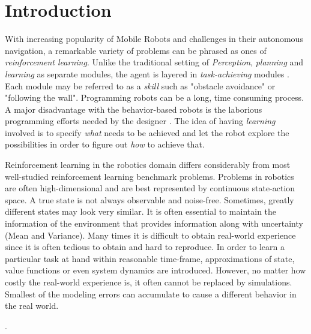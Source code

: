 \documentclass[12pt]{report}
\begin{document}
\tableofcontents
\pagebreak

\listoffigures
\pagebreak

\listoftables
\pagebreak

\printacronyms
\pagebreak

\pagestyle{myheadings}



\chapter{Introduction} %

\label{introduction} %

With increasing popularity of Mobile Robots and challenges in their autonomous navigation, a remarkable variety of problems can be phrased as ones of \textit{reinforcement learning}. Unlike the traditional setting of \textit{Perception}, \textit{planning} and \textit{learning} as separate modules, the agent is layered in \textit{task-achieving} modules \cite{mahadevan1992automatic}. Each module may be referred to as a \textit{skill} such as "obstacle avoidance" or "following the wall". Programming robots can be a long, time consuming process. A major disadvantage with the behavior-based robots is the laborious programming efforts needed by the designer \cite{mahadevan1992automatic} \cite{smart2002effective}. The idea of having \textit{learning} involved is to specify \textit{what} needs to be achieved and let the robot explore the possibilities in order to figure out \textit{how} to achieve that.\par

Reinforcement learning in the robotics domain differs considerably from most well-studied reinforcement
learning benchmark problems. Problems in robotics are often high-dimensional and are best represented by continuous state-action space. A true state is not always observable and noise-free. Sometimes, greatly different states may look very similar. It is often essential to maintain the information of the environment that provides information along with uncertainty (Mean and Variance). Many times it is difficult to obtain real-world experience since it is often tedious to obtain and hard to reproduce. In order to learn a particular task at hand within reasonable time-frame, approximations of state, value functions or even system dynamics are introduced.  However, no matter how costly the real-world experience is, it often cannot be replaced by simulations. Smallest of the modeling errors can accumulate to cause a different behavior in the real world.\par {}.
\end{document}
